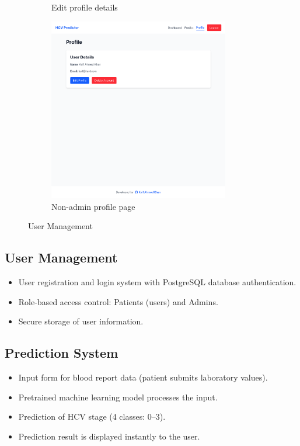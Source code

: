 \begin{figure}[htbp]
\begin{subfigure}{0.5\textwidth}
    \caption{Edit profile details}
    \label{fig:edit}
  \end{subfigure}
  \begin{subfigure}{0.5\textwidth}
    \includegraphics[width=0.9\linewidth, height=8cm]{figures/site/normaluser.png}
    \caption{Non-admin profile page}
    \label{fig:detail}
  \end{subfigure}
  \caption{User Management}
  \label{fig:image3}
\end{figure}

\subsection*{User Management}
\begin{itemize}
    \item User registration and login system with PostgreSQL database authentication.
    \item Role-based access control: Patients (users) and Admins.
    \item Secure storage of user information.
\end{itemize}
\subsection*{Prediction System}
\begin{itemize}
    \item Input form for blood report data (patient submits laboratory values).
    \item Pretrained machine learning model processes the input.
    \item Prediction of HCV stage (4 classes: 0--3).
    \item Prediction result is displayed instantly to the user.
\end{itemize}

